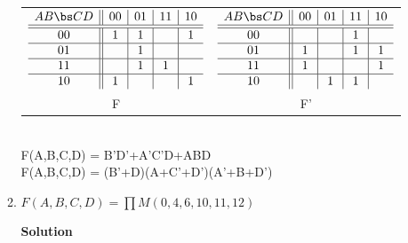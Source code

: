 \begin{enumerate}
\begin{enumerate}
\begin{onlysolution}
{                        \begin{tabular}{cc}
                            $
                            \begin{array} {c||c|c|c|c}
                                A B \bs C D   & 00 & 01 & 11 & 10 \\ \hline \hline
                                00        & 1  & 1  &    & 1  \\ \hline
                                01        &    & 1  &    &    \\ \hline
                                11        &    & 1  & 1  &    \\ \hline
                                10        & 1  &    &    & 1  \\
                            \end{array}$ &
                            $
                            \begin{array} {c||c|c|c|c}
                                A B \bs C D   & 00 & 01 & 11 & 10 \\ \hline \hline
                                00        &    &    & 1  &    \\ \hline
                                01        & 1  &    & 1  & 1  \\ \hline
                                11        & 1  &    &    & 1  \\ \hline
                                10        &    & 1  & 1  &    \\
                            \end{array}$ \\
                            F  & F' \\
                        \end{tabular} \\
                        \SOPmin F(A,B,C,D) =  B'D'+A'C'D+ABD\\
                        \POSmin F(A,B,C,D) =  (B'+D)(A+C'+D')(A'+B+D')
                    }
                \end{onlysolution}

            \item  $F(A,B,C,D) = \prod M(0,4,6,10,11,12)$

                \begin{onlysolution}  \textbf{Solution} \itshape{

}
\end{onlysolution}
\end{enumerate}
\end{enumerate}
